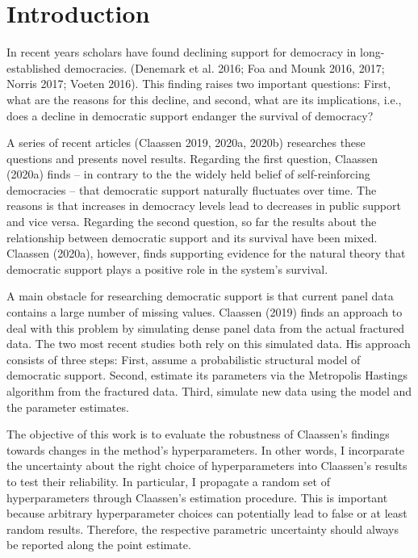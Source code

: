 \documentclass[12pt,english,a4paper,oneside]{article}
\theoremstyle{definition}
\theoremstyle{definition}
\theoremstyle{definition}
\theoremstyle{definition}
\theoremstyle{remark}
\begin{document}
\newpage







{
\setcounter{tocdepth}{2}
\newpage
{}
\tableofcontents
}

\newpage
{}
\pagestyle{plain}
\hypertarget{introduction}{%
\section{Introduction}\label{introduction}}

In recent years scholars have found declining support for democracy in long-established democracies. (Denemark et al. 2016; Foa and Mounk 2016, 2017; Norris 2017; Voeten 2016). This finding raises two important questions: First, what are the reasons for this decline, and second, what are its implications, i.e., does a decline in democratic support endanger the survival of democracy?

A series of recent articles (Claassen 2019, 2020a, 2020b) researches these questions and presents novel results. Regarding the first question, Claassen (2020a) finds -- in contrary to the the widely held belief of self-reinforcing democracies -- that democratic support naturally fluctuates over time. The reasons is that increases in democracy levels lead to decreases in public support and vice versa. Regarding the second question, so far the results about the relationship between democratic support and its survival have been mixed. Claassen (2020a), however, finds supporting evidence for the natural theory that democratic support plays a positive role in the system's survival.

A main obstacle for researching democratic support is that current panel data contains a large number of missing values. Claassen (2019) finds an approach to deal with this problem by simulating dense panel data from the actual fractured data. The two most recent studies both rely on this simulated data. His approach consists of three steps: First, assume a probabilistic structural model of democratic support. Second, estimate its parameters via the Metropolis Hastings algorithm from the fractured data. Third, simulate new data using the model and the parameter estimates.

The objective of this work is to evaluate the robustness of Claassen's findings towards changes in the method's hyperparameters. In other words, I incorparate the uncertainty about the right choice of hyperparameters into Claassen's results to test their reliability. In particular, I propagate a random set of hyperparameters through Claassen's estimation procedure. This is important because arbitrary hyperparameter choices can potentially lead to false or at least random results. Therefore, the respective parametric uncertainty should always be reported along the point estimate.
\end{document}
